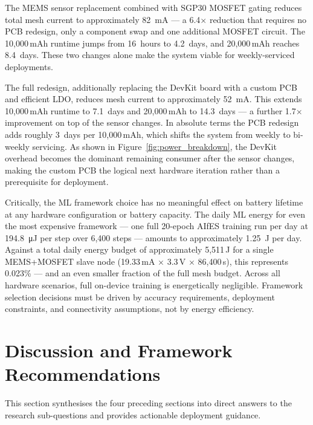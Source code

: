 The MEMS sensor replacement combined with SGP30 MOSFET gating reduces total mesh current to approximately \SI{82}{\milli\ampere} --- a 6.4$\times$ reduction that requires no PCB redesign, only a component swap and one additional MOSFET circuit. The 10,000\,mAh runtime jumps from 16~hours to 4.2~days, and 20,000\,mAh reaches 8.4~days. These two changes alone make the system viable for weekly-serviced deployments.

The full redesign, additionally replacing the DevKit board with a custom PCB and efficient LDO, reduces mesh current to approximately \SI{52}{\milli\ampere}. This extends 10,000\,mAh runtime to 7.1~days and 20,000\,mAh to 14.3~days --- a further 1.7$\times$ improvement on top of the sensor changes. In absolute terms the PCB redesign adds roughly 3~days per 10,000\,mAh, which shifts the system from weekly to bi-weekly servicing. As shown in Figure~\ref{fig:power_breakdown}, the DevKit overhead becomes the dominant remaining consumer after the sensor changes, making the custom PCB the logical next hardware iteration rather than a prerequisite for deployment.

Critically, the ML framework choice has no meaningful effect on battery lifetime at any hardware configuration or battery capacity. The daily ML energy for even the most expensive framework --- one full 20-epoch AIfES training run per day at \SI{194.8}{\micro\joule} per step over 6,400 steps --- amounts to approximately \SI{1.25}{\joule} per day. Against a total daily energy budget of approximately 5,511\,J for a single MEMS+MOSFET slave node (19.33\,mA $\times$ 3.3\,V $\times$ 86,400\,s), this represents 0.023\% --- and an even smaller fraction of the full mesh budget. Across all hardware scenarios, full on-device training is energetically negligible. Framework selection decisions must be driven by accuracy requirements, deployment constraints, and connectivity assumptions, not by energy efficiency.

\section{Discussion and Framework Recommendations}\label{sec:res_discussion}

This section synthesises the four preceding sections into direct answers to the research sub-questions and provides actionable deployment guidance.

